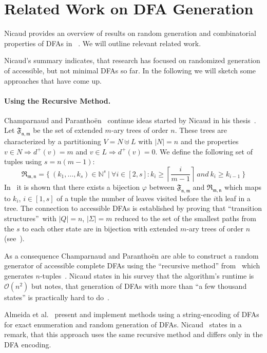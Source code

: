 \section{Related Work on DFA Generation}

Nicaud provides an overview of results on random generation and combinatorial properties of DFAs in ~\cite{Nic14}. We will outline relevant related work.

Nicaud's summary indicates, that research has focused on randomized generation of accessible, but not minimal DFAs so far. In the following we will sketch some approaches that have come up.

\paragraph*{Using the Recursive Method.}

Champarnaud and Paranthoën~\cite{CP05} continue ideas started by Nicaud in his thesis~\cite{Nic00}. Let $\mathfrak{F_{n,m}}$ be the set of extended $m$-ary trees of order $n$. These trees are characterized by a partitioning $V = N \uplus L$ with $|N| = n$ and the properties $v \in N \Rightarrow d^+(v) = m$ and $v \in L \Rightarrow d^+(v) = 0$. We define the following set of tuples using $s=n(m-1)$:
\[
    \mathfrak{R_{m,n}} = \{\ (k_1,\ldots,k_s) \in \mathbb{N}^s\ |\ \forall i\in [2,s]\colon k_i \geq \left\lceil\frac{i}{m-1}\right\rceil\ and\ k_i \geq k_{i-1}\ \}
\]
In~\cite[p. 6]{CP05} it is shown that there exists a bijection $\varphi$ between $\mathfrak{F_{n,m}}$ and $\mathfrak{R_{m,n}}$ which maps to $k_i$, $i\in[1,s]$ of a tuple the number of leaves visited before the $i$th leaf in a tree. The connection to accessible DFAs is established by proving that  ``transition structures\footnotemark''\ with $|Q|=n$, $|\Sigma|=m$ reduced to the set of the smallest paths from the $s$ to each other state are in bijection with extended $m$-ary trees of order $n$ (see~\cite[p. 8]{CP05}).

As a consequence Champarnaud and Paranthoën are able to construct a random generator of accessible complete DFAs using the ``recursive method'' from~\cite{NW78} which generates $n$-tuples~\cite[p. 10]{CP05}. Nicaud states in his survey that the algorithm's runtime is $\mathcal{O}(n^2)$ but notes, that generation of DFAs with more than ``a few thousand states'' is practically hard to do~\cite[pp. 10-11]{Nic14}.

Almeida et al.~\cite{AAA09, AMR09, RMA05} present and implement methods using a string-encoding of DFAs for exact enumeration and random generation of DFAs. Nicaud~\cite[p. 11]{Nic14} states in a remark, that this approach uses the same recursive method and differs only in the DFA encoding.

